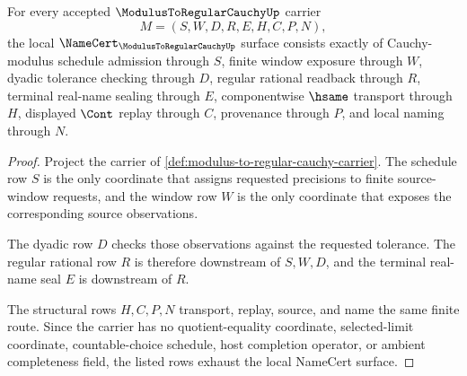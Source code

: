 \begin{theorem}
\label{thm:modulus-to-regular-cauchy-namecert-obligations}
For every accepted $\ModulusToRegularCauchyUp$ carrier
$$
M=(S,W,D,R,E,H,C,P,N),
$$
the local $\NameCert_{\ModulusToRegularCauchyUp}$ surface consists exactly of Cauchy-modulus schedule admission through $S$, finite window exposure through $W$, dyadic tolerance checking through $D$, regular rational readback through $R$, terminal real-name sealing through $E$, componentwise $\hsame$ transport through $H$, displayed $\Cont$ replay through $C$, provenance through $P$, and local naming through $N$.
\end{theorem}
\begin{proof}
Project the carrier of \autoref{def:modulus-to-regular-cauchy-carrier}. The schedule row $S$ is the only coordinate that assigns requested precisions to finite source-window requests, and the window row $W$ is the only coordinate that exposes the corresponding source observations.

The dyadic row $D$ checks those observations against the requested tolerance. The regular rational row $R$ is therefore downstream of $S,W,D$, and the terminal real-name seal $E$ is downstream of $R$.

The structural rows $H,C,P,N$ transport, replay, source, and name the same finite route. Since the carrier has no quotient-equality coordinate, selected-limit coordinate, countable-choice schedule, host completion operator, or ambient completeness field, the listed rows exhaust the local NameCert surface.
\end{proof}

